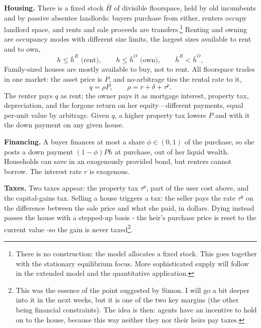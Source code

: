 \documentclass[11pt]{article}
\begin{document}
\textbf{Housing.} There is a fixed stock $\bar H$ of divisible floorspace, held by old incumbents and by passive absentee landlords: buyers purchase from either, renters occupy landlord space, and rents and sale proceeds are transfers.\footnote{There is no construction: the model allocates a fixed stock. This goes together with the stationary equilibrium focus. More sophisticated supply will follow in the extended model and the quantitative application.} Renting and owning are occupancy modes with different size limits, the largest sizes available to rent and to own,
\[
h\le\bar h^R \text{ (rent)},
\qquad
h\le\bar h^O \text{ (own)},
\qquad
\bar h^R<\bar h^O ,
\]
Family-sized houses are mostly available to buy, not to rent. All floorspace trades in one market: the asset price is $P$, and no-arbitrage ties the rental rate to it,
\[
q=\rho P,
\qquad
\rho=r+\delta+\tau^p .
\]
The renter pays $q$ as rent; the owner pays it as mortgage interest, property tax, depreciation, and the forgone return on her equity---different payments, equal per-unit value by arbitrage. Given $q$, a higher property tax lowers $P$ and with it the down payment on any given house.

\textbf{Financing.} A buyer finances at most a share $\phi\in(0,1)$ of the purchase, so she posts a down payment $(1-\phi)Ph$ at purchase, out of her liquid wealth. Households can save in an exogenously provided bond, but renters cannot borrow. The interest rate $r$ is exogenous.

\textbf{Taxes.} Two taxes appear: the property tax $\tau^p$, part of the user cost above, and the capital-gains tax. Selling a house triggers a tax: the seller pays the rate $\tau^g$ on the difference between the sale price and what she paid, in dollars. Dying instead passes the house with a stepped-up basis - the heir's purchase price is reset to the current value -so the gain is never taxed\footnote{This was the essence of the point suggested by Simon. I will go a bit deeper into it in the next weeks, but it is one of the two key margins (the other being financial constraints). The idea is then: agents have an incentive to hold on to the house, because this way neither they nor their heirs pay taxes.}.
\end{document}
